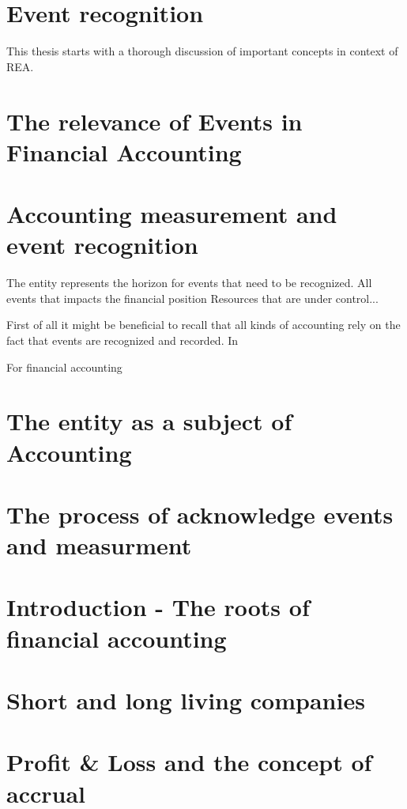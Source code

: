 \section{Event recognition}





This thesis starts with a thorough discussion of important concepts in context of REA.








\section{The relevance of Events in Financial Accounting}
\section{Accounting measurement and event recognition}



The entity represents the horizon for events that need to be recognized.
All events that impacts the financial position 
Resources that are under control...

First of all it might be beneficial to recall that all kinds of accounting rely on the fact that events are recognized and recorded.
In 


For financial accounting 

\cite{horngren1984introduction} 


\section{The entity as a subject of Accounting}

\section{The process of acknowledge events and measurment}


\section{Introduction - The roots of financial accounting}
\section{Short and long living companies}
\section{Profit \& Loss and the concept of accrual}
